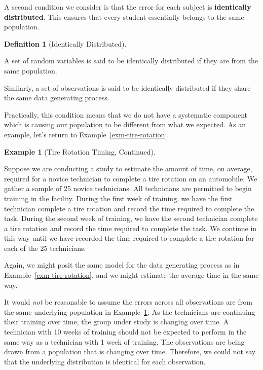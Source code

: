 \documentclass[
  letterpaper,
  DIV=11,
  numbers=noendperiod]{scrreprt}
\theoremstyle{plain}
\theoremstyle{definition}
\newtheorem{example}{Example}[chapter]
\theoremstyle{definition}
\newtheorem{definition}{Definition}[chapter]
\theoremstyle{remark}
\begin{document}
A second condition we consider is that the error for each subject is
\textbf{identically distributed}. This ensures that every student
essentially belongs to the same population.

\begin{definition}[Identically
Distributed]\protect\hypertarget{def-identically-distributed}{}\label{def-identically-distributed}

A set of random variables is said to be identically distributed if they
are from the same population.

Similarly, a set of observations is said to be identically distributed
if they share the same data generating process.

\end{definition}

Practically, this condition means that we do not have a systematic
component which is causing our population to be different from what we
expected. As an example, let's return to
Example~\ref{exm-tire-rotation}.

\begin{example}[Tire Rotation Timing,
Continued]\protect\hypertarget{exm-tire-rotation-alt}{}\label{exm-tire-rotation-alt}

Suppose we are conducting a study to estimate the amount of time, on
average, required for a novice technician to complete a tire rotation on
an automobile. We gather a sample of 25 novice technicians. All
technicians are permitted to begin training in the facility. During the
first week of training, we have the first technician complete a tire
rotation and record the time required to complete the task. During the
second week of training, we have the second technician complete a tire
rotation and record the time required to complete the task. We continue
in this way until we have recorded the time required to complete a tire
rotation for each of the 25 technicians.

Again, we might posit the same model for the data generating process as
in Example~\ref{exm-tire-rotation}, and we might estimate the average
time in the same way.

\end{example}

It would \emph{not} be reasonable to assume the errors across all
observations are from the same underlying population in
Example~\ref{exm-tire-rotation-alt}. As the technicians are continuing
their training over time, the group under study is changing over time. A
technician with 10 weeks of training should not be expected to perform
in the same way as a technician with 1 week of training. The
observations are being drawn from a population that is changing over
time. Therefore, we could not say that the underlying distribution is
identical for each observation.
\end{document}
